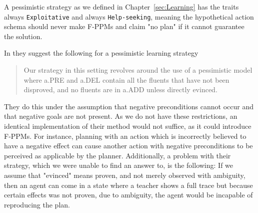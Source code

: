 \documentclass[\master/Master.tex]{subfiles}
\begin{document}
	A pessimistic strategy as we defined in Chapter~\ref{sec:Learning} has the traits always \texttt{Exploitative} and always \texttt{Help-seeking},
	meaning the hypothetical action schema should never make F-PPMs and claim "no plan" if it cannot guarantee the solution.

	In \cite{Walsh2008} they suggest the following for a pessimistic learning strategy
	
	\begin{quotation}
		Our strategy in
		this setting revolves around the use of a pessimistic model
		where a.PRE and a.DEL contain all the fluents that have
		not been disproved, and no fluents are in a.ADD unless directly
		evinced.
	\end{quotation}
	 
	They do this under the assumption that negative preconditions cannot occur and that negative goals are not present. As we do not have these restrictions, an identical implementation of their method would not suffice, as it could introduce F-PPMs. For instance, planning with an action which is incorrectly believed to have a negative effect can cause another action with negative preconditions to be perceived as applicable by the planner.
	Additionally, a problem with their strategy, which we were unable to find an answer to, is the following: If we assume that "evinced" means proven, and not merely observed with ambiguity, then an agent can come in a state where a teacher shows a full trace but because certain effects was not proven, due to ambiguity, the agent would be incapable of reproducing the plan.
	
\end{document}
